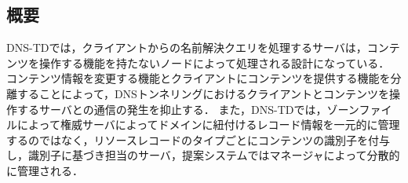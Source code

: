 \subsection{概要}
\label{sec:DNS-TD}
DNS-TDでは，クライアントからの名前解決クエリを処理するサーバは，コンテンツを操作する機能を持たないノードによって処理される設計になっている．
コンテンツ情報を変更する機能とクライアントにコンテンツを提供する機能を分離することによって，DNSトンネリングにおけるクライアントとコンテンツを操作するサーバとの通信の発生を抑止する．
また，DNS-TDでは，ゾーンファイルによって権威サーバによってドメインに紐付けるレコード情報を一元的に管理するのではなく，リソースレコードのタイプごとにコンテンツの識別子を付与し，識別子に基づき担当のサーバ，提案システムではマネージャによって分散的に管理される．
